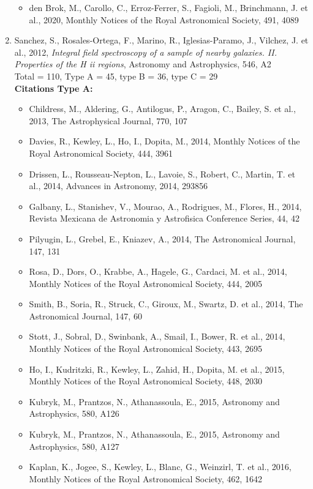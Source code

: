 \documentclass{letter}
\begin{document}
\begin{enumerate}
\begin{itemize}
\item den Brok, M., Carollo, C., Erroz-Ferrer, S., Fagioli, M., Brinchmann, J. et al., 2020, Monthly Notices of the Royal Astronomical Society, 491, 4089
\end{itemize}
\item Sanchez, S., Rosales-Ortega, F., Marino, R., Iglesias-Paramo, J., Vilchez, J. et al., 2012, {\it Integral field spectroscopy of a sample of nearby galaxies. II. Properties of the H ii regions}, Astronomy and Astrophysics, 546, A2 \\ 
Total = 110, Type A = 45, type B = 36, type C = 29 \\ 
{\bf Citations Type A:}
\begin{itemize}
\item Childress, M., Aldering, G., Antilogus, P., Aragon, C., Bailey, S. et al., 2013, The Astrophysical Journal, 770, 107
\item Davies, R., Kewley, L., Ho, I., Dopita, M., 2014, Monthly Notices of the Royal Astronomical Society, 444, 3961
\item Drissen, L., Rousseau-Nepton, L., Lavoie, S., Robert, C., Martin, T. et al., 2014, Advances in Astronomy, 2014, 293856
\item Galbany, L., Stanishev, V., Mourao, A., Rodrigues, M., Flores, H., 2014, Revista Mexicana de Astronomia y Astrofisica Conference Series, 44, 42
\item Pilyugin, L., Grebel, E., Kniazev, A., 2014, The Astronomical Journal, 147, 131
\item Rosa, D., Dors, O., Krabbe, A., Hagele, G., Cardaci, M. et al., 2014, Monthly Notices of the Royal Astronomical Society, 444, 2005
\item Smith, B., Soria, R., Struck, C., Giroux, M., Swartz, D. et al., 2014, The Astronomical Journal, 147, 60
\item Stott, J., Sobral, D., Swinbank, A., Smail, I., Bower, R. et al., 2014, Monthly Notices of the Royal Astronomical Society, 443, 2695
\item Ho, I., Kudritzki, R., Kewley, L., Zahid, H., Dopita, M. et al., 2015, Monthly Notices of the Royal Astronomical Society, 448, 2030
\item Kubryk, M., Prantzos, N., Athanassoula, E., 2015, Astronomy and Astrophysics, 580, A126
\item Kubryk, M., Prantzos, N., Athanassoula, E., 2015, Astronomy and Astrophysics, 580, A127
\item Kaplan, K., Jogee, S., Kewley, L., Blanc, G., Weinzirl, T. et al., 2016, Monthly Notices of the Royal Astronomical Society, 462, 1642

\end{itemize}
\end{enumerate}
\end{document}
